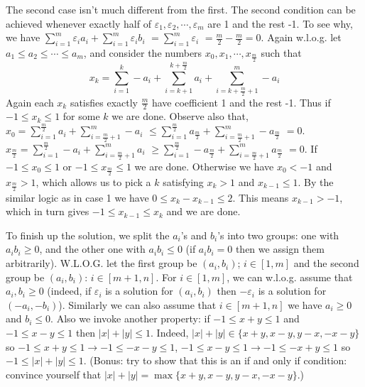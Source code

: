 \documentclass[11pt,a4paper]{article}
\begin{document}
\begin{itemize}
The second case isn't much different from the first. 
The second condition can be achieved whenever exactly half of $\varepsilon_1, \varepsilon_2, \cdots , \varepsilon_m$ are 1 and the rest -1. 
To see why, we have 
$ \sum_{i=1}^m \varepsilon_i a_i  + \sum_{i=1}^m \varepsilon_i b_i $
$=\sum_{i=1}^m \varepsilon_i$
$=\frac m2-\frac m2=0$. 
Again w.l.o.g. let $a_1\le a_2\le\cdots \le a_m$, and consider the numbers 
$x_0, x_1, \cdots , x_{\frac{m}2}$ such that 
\[ x_k=\sum_{i=1}^{k} -a_i+\sum_{i=k+1}^{k+\frac{m}{2}} a_i+\sum_{i=k+\frac{m}{2}+1}^{m} -a_i\]
Again each $x_k$ satisfies exactly $\frac m2$ have coefficient 1 and the rest -1. 
Thus if $-1\le x_k\le 1$ for some $k$ we are done. 
Observe also that, $x_0=\sum_{i=1}^{\frac{m}{2}} a_i+\sum_{i=\frac{m}{2}+1}^{m} -a_i$
$\le \sum_{i=1}^{\frac{m}{2}} a_{\frac{m}{2}} +\sum_{i=\frac{m}{2}+1}^{m} -a_{\frac{m}{2}}$
$=0$. 
$x_{\frac{m}{2}}=\sum_{i=1}^{\frac{m}{2}} -a_i+\sum_{i=\frac{m}{2}+1}^{m} a_i$
$\ge \sum_{i=1}^{\frac{m}{2}} -a_{\frac{m}{2}} +\sum_{i=\frac{m}{2}+1}^{m} a_{\frac{m}{2}}$
$=0$. 
If $-1\le x_0\le 1$ or $-1\le x_{\frac m2}\le 1$ we are done. 
Otherwise we have $x_0<-1$ and $x_{\frac m2}>1$, 
which allows us to pick a $k$ satisfying $x_k>1$ and $x_{k-1}\le 1$. 
By the similar logic as in case 1 we have $0\le x_k-x_{k-1}\le 2$. 
This means $x_{k-1}>-1$, which in turn gives $-1\le x_{k-1}\le x_k$ and we are done. 

To finish up the solution, 
we split the $a_i$'s and $b_i$'s into two groups: 
one with $a_ib_i\ge 0$, and the other one with $a_ib_i\le 0$ (if $a_ib_i=0$ then we assign them arbitrarily). 
W.L.O.G. let the first group be 
$(a_i, b_i)$; $i\in [1, m]$ and the second group be $(a_i, b_i)$: $i\in [m+1, n]$. 
For $i\in [1, m]$, we can w.l.o.g. assume that $a_i, b_i\ge 0$ (indeed, if $\varepsilon_i$ is a solution for $(a_i, b_i)$ then $-\varepsilon_i$ is a solution for $(-a_i, -b_i)$). 
Similarly we can also assume that $i\in [m+1, n]$ we have $a_i\ge 0$ and $b_i\le 0$. 
Also we invoke another property: if $-1\le x+y\le 1$ and $-1\le x-y\le 1$ then $|x|+|y|\le 1$. 
Indeed, $|x|+|y|\in \{x+y, x-y, y-x, -x-y\}$ so $-1\le x+y\le 1\to -1\le -x-y\le 1$, 
$-1\le x-y\le 1\to -1\le -x+y\le 1$ so $-1\le |x|+|y|\le 1$. 
(Bonus: try to show that this is an if and only if condition: convince yourself that $|x|+|y|=\max \{x+y, x-y, y-x, -x-y\}$.)


\end{itemize}
\end{document}

